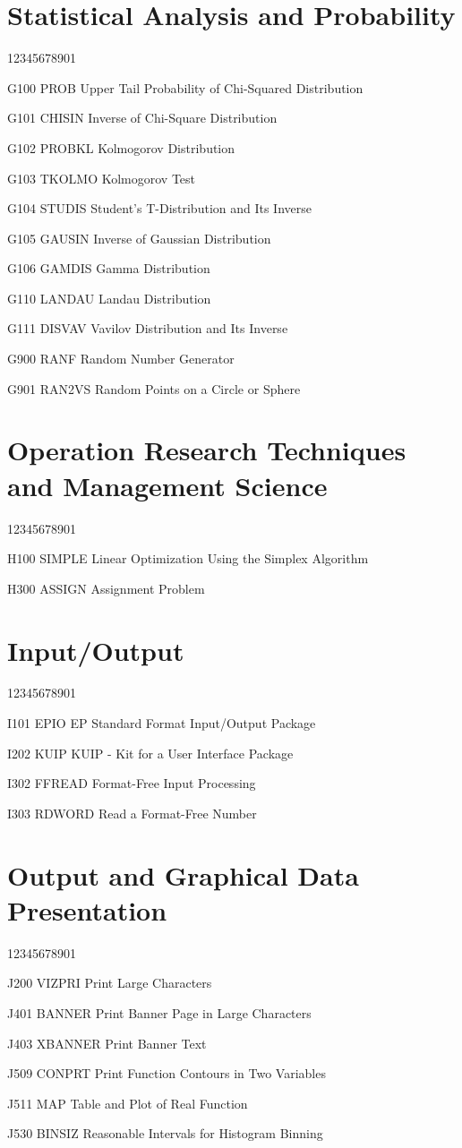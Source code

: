 \section*{Statistical Analysis and Probability}
\begin{DLtt}{12345678901}
\item[G100 PROB] Upper Tail Probability of Chi-Squared Distribution
\item[G101 CHISIN] Inverse of Chi-Square Distribution
\item[G102 PROBKL] Kolmogorov Distribution
\item[G103 TKOLMO] Kolmogorov Test
\item[G104 STUDIS] Student's T-Distribution and Its Inverse
\item[G105 GAUSIN] Inverse of Gaussian Distribution
\item[G106 GAMDIS] Gamma Distribution
\item[G110 LANDAU] Landau Distribution
\item[G111 DISVAV] Vavilov Distribution and Its Inverse
\item[G900 RANF] Random Number Generator
\item[G901 RAN2VS] Random Points on a Circle or Sphere
\end{DLtt}
\section*{Operation Research Techniques and Management Science}
\begin{DLtt}{12345678901}
\item[H100 SIMPLE] Linear Optimization Using the Simplex Algorithm
\item[H300 ASSIGN] Assignment Problem
\end{DLtt}
\section*{Input/Output}
\begin{DLtt}{12345678901}
\item[I101 EPIO] EP Standard Format Input/Output Package
\item[I202 KUIP] KUIP - Kit for a User Interface Package
\item[I302 FFREAD] Format-Free Input Processing
\item[I303 RDWORD] Read a Format-Free Number
\end{DLtt}
\section*{Output and Graphical Data Presentation}
\begin{DLtt}{12345678901}
\item[J200 VIZPRI] Print Large Characters
\item[J401 BANNER] Print Banner Page in Large Characters
\item[J403 XBANNER] Print Banner Text
\item[J509 CONPRT] Print Function Contours in Two Variables
\item[J511 MAP] Table and Plot of Real Function
\item[J530 BINSIZ] Reasonable Intervals for Histogram Binning
\end{DLtt}
